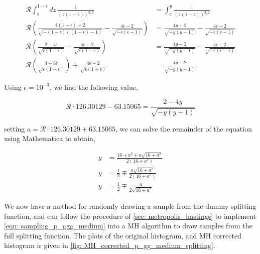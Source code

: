 \documentclass[main.tex]{subfiles}
\begin{document}
\begin{align}
    \mathcal{R} \int_\epsilon^{1-\epsilon} dz \, \frac{1}{(z(1-z))^{3/2}} &= \int_\epsilon^{y} \frac{1}{(z(1-z))^{3/2}} \nonumber \\
    \mathcal{R} \left(  \frac{4(1-\epsilon)-2}{\sqrt{-(1-\epsilon)((1-\epsilon)-1)}} - \frac{4\epsilon-2}{\sqrt{-\epsilon(\epsilon-1)}} \right) &= \frac{4y-2}{\sqrt{-y(y-1)}} - \frac{4\epsilon-2}{\sqrt{-\epsilon(\epsilon-1)}} \nonumber\\
    \mathcal{R} \left(  \frac{2-4\epsilon}{\sqrt{\epsilon(1-\epsilon)}} - \frac{4\epsilon-2}{\sqrt{\epsilon(1-\epsilon)}} \right) &= \frac{4y-2}{\sqrt{-y(y-1)}} - \frac{4\epsilon-2}{\sqrt{-\epsilon(\epsilon-1)}} \nonumber\\
    \mathcal{R} \left(  \frac{4-8\epsilon}{\sqrt{\epsilon(1-\epsilon)}} \right) + \frac{4\epsilon-2}{\sqrt{\epsilon(1-\epsilon)}} &= \frac{4y-2}{\sqrt{-y(y-1)}}
\end{align}

Using \(\epsilon = 10^{-3}\), we find the following value, 

\begin{equation}
    \mathcal{R} \cdot 126.30129 - 63.15065 = \frac{2-4y}{\sqrt{-y(y-1)}}
\end{equation}

setting \(a = \mathcal{R} \cdot 126.30129 + 63.15065\), we can solve the remainder of the equation using Mathematica to obtain, 

\begin{align}\label{eqn: sampling_p_ggg_medium}
    y &= \frac{16 + a^2 \mp a \sqrt{16 + a^2}}{2 (16 + a^2)} \nonumber\\
    y &= \frac{1}{2} \mp \frac{a \sqrt{16 + a^2}}{2 (16 + a^2)} \nonumber\\
    y &= \frac{1}{2} \mp \frac{a }{2 \sqrt{16 + a^2}}
\end{align}

We now have a method for randomly drawing a sample from the dummy splitting function, and can follow the procedure of \autoref{sec: metropolis_hastings} to implement \autoref{eqn: sampling_p_ggg_medium} into a MH algorithm to draw samples from the full splitting function. The plots of the original histogram, and MH corrected histogram is given in \autoref{fig: MH_corrected_p_gg_medium_splitting}.
\end{document}
